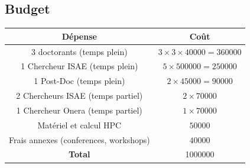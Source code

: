\documentclass[french]{article}
\begin{document}
\subsection{Budget}
\begin{center}
\begin{tabular}{|c|c|}
	\hline
	D\'epense & Co\^{u}t \\
	\hline
	3 doctorants (temps plein) & $3\times 3\times 40000=360000$  \\
	1 Chercheur ISAE (temps plein) & $5\times 500000=250000$ \\
	1 Post-Doc (temps plein) & $2\times 45000=90000$ \\
	2 Chercheurs ISAE (temps partiel)& $2\times 70000$ \\
	1 Chercheur Onera (temps partiel)& $1\times 70000$ \\
	Matériel  et calcul HPC & $50000$ \\
	Frais annexes (conferences, workshops) & $40000$ \\
	\hline
	\textbf{Total} & 1000000 \\
	\hline
\end{tabular}
\end{center}






\end{document}
